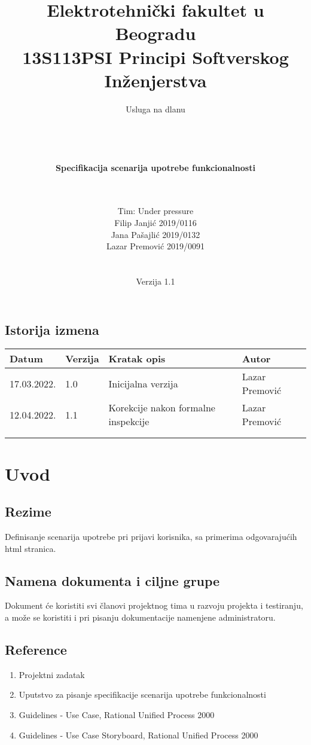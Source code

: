 \documentclass[a4paper,12pt]{report}
\title{\Large Elektrotehnički fakultet u Beogradu \\ 13S113PSI Principi Softverskog Inženjerstva}
\author{\Huge Usluga na dlanu\\ \ \\ \ \\ \ \\ \ \\
	\Large \textbf{Specifikacija scenarija upotrebe funkcionalnosti}\\\Large \textbf{\genitivfunkcionalnosti} \\ \ \\}
\date{\Large   Tim: Under pressure \\ Filip Janjić 2019/0116 \\ Jana Pašajlić 2019/0132 \\ Lazar Premović 2019/0091  \\ \  \\ \  \\
	\large Verzija 1.1}
\newcommand{\dativfunkcionalnosti }{prijavi korisnika}
\newcommand{\inicijalniautor}{Lazar Premović}
\newcommand{\inicijalnidatum}{17.03.2022.}
\begin{document}
	
	\maketitle
	
	\begin{center}
		\section*{Istorija izmena}
			\begin{tabular}{ |l|l|l|l| }
				\hline
				\textbf{Datum} & \textbf{Verzija} & \textbf{Kratak opis} & \textbf{Autor} \\ 
				\hline
				\inicijalnidatum & 1.0  & Inicijalna verzija & \inicijalniautor \\
				\hline
				12.04.2022. & 1.1 & Korekcije nakon formalne inspekcije & \inicijalniautor \\
				\hline
				&  &  &  \\
				\hline
				&  &  &  \\
				\hline
			\end{tabular}
	\end{center}
	
	\newpage
	
	\tableofcontents
	
	\newpage
	
	\section{Uvod}
		\subsection{Rezime}
			Definisanje scenarija upotrebe pri \dativfunkcionalnosti, sa primerima odgovarajućih html stranica.
		\subsection{Namena dokumenta i ciljne grupe}
			Dokument će koristiti svi članovi projektnog tima u razvoju projekta i testiranju, a može se koristiti i pri pisanju dokumentacije namenjene administratoru.
		\subsection{Reference}
			\begin{enumerate}
				\item Projektni zadatak
				\item Uputstvo za pisanje specifikacije scenarija upotrebe funkcionalnosti
				\item Guidelines - Use Case, Rational Unified Process 2000
				\item Guidelines - Use Case Storyboard, Rational Unified Process 2000
			\end{enumerate}
\end{document}
